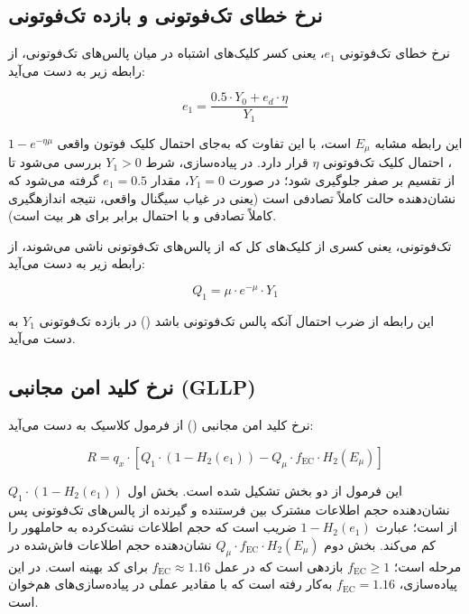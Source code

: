 \subsection{نرخ خطای تک‌فوتونی و بازده تک‌فوتونی}

نرخ خطای تک‌فوتونی $e_1$، یعنی کسر کلیک‌های اشتباه در میان پالس‌های تک‌فوتونی، از رابطه زیر به دست می‌آید:

\begin{equation}
	e_1 = \frac{0.5 \cdot Y_0 + e_d \cdot \eta}{Y_1}
\end{equation}

این رابطه مشابه $E_\mu$ است، با این تفاوت که به‌جای احتمال کلیک فوتون واقعی $1 - e^{-\eta \mu}$، احتمال کلیک تک‌فوتونی $\eta$ قرار دارد. در پیاده‌سازی، شرط $Y_1 > 0$ بررسی می‌شود تا از تقسیم بر صفر جلوگیری شود؛ در صورت $Y_1 = 0$، مقدار $e_1 = 0.5$ گرفته می‌شود که نشان‌دهنده حالت کاملاً تصادفی است (یعنی در غیاب سیگنال واقعی، نتیجه اندازهگیری کاملاً تصادفی و با احتمال برابر برای هر بیت است).

 تک‌فوتونی، یعنی کسری از کلیک‌های کل که از پالس‌های تک‌فوتونی ناشی می‌شوند، از رابطه زیر به دست می‌آید:

\begin{equation}
	Q_1 = \mu \cdot e^{-\mu} \cdot Y_1
\end{equation}

این رابطه از ضرب احتمال آنکه پالس تک‌فوتونی باشد () در بازده تک‌فوتونی $Y_1$ به دست می‌آید.

\subsection{نرخ کلید امن مجانبی (GLLP)}

نرخ کلید امن مجانبی () از فرمول کلاسیک  به دست می‌آید:

\begin{equation}
	R = q_x \cdot \left[ Q_1 \cdot (1 - H_2(e_1)) - Q_\mu \cdot f_{\text{EC}} \cdot H_2(E_\mu) \right]
\end{equation}

این فرمول از دو بخش تشکیل شده است. بخش اول $Q_1 \cdot (1 - H_2(e_1))$ نشان‌دهنده حجم اطلاعات مشترک بین فرستنده و گیرنده از پالس‌های تک‌فوتونی پس از  است؛ عبارت $1 - H_2(e_1)$ ضریب  است که حجم اطلاعات نشت‌کرده به حاملهور را کم می‌کند. بخش دوم $Q_\mu \cdot f_{\text{EC}} \cdot H_2(E_\mu)$ نشان‌دهنده حجم اطلاعات فاش‌شده در مرحله  است؛ $f_{\text{EC}} \geq 1$ بازدهی  است که در عمل $f_{\text{EC}} \approx 1.16$ برای کد  بهینه است. در این پیاده‌سازی، $f_{\text{EC}} = 1.16$ به‌کار رفته است که با مقادیر عملی در پیاده‌سازی‌های  هم‌خوان است.

